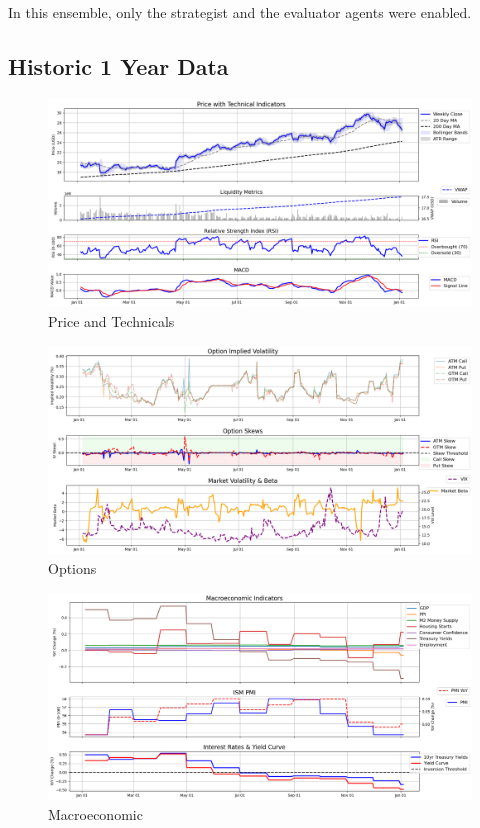 \documentclass[8pt]{scrartcl}
\begin{document}
In this ensemble, only the strategist and the evaluator agents were enabled.

\subsection*{Historic 1 Year Data}

\begin{figure}[H]
    \centering
    \includegraphics[width=1\linewidth]{judge_reviews/AAPL_M_gpt-4o-mini//2015-01-05/judge_Price_with_Technical_Indicators.png}
    \caption{Price and Technicals}
\end{figure}

\begin{figure}[H]
    \centering
    \includegraphics[width=1\linewidth]{judge_reviews/AAPL_M_gpt-4o-mini/2015-01-05/judge_Option_Implied_Volatility.png}
    \caption{Options}
\end{figure}

\begin{figure}[H]
    \centering
    \includegraphics[width=1\linewidth]{judge_reviews/AAPL_M_gpt-4o-mini/2015-01-05/judge_Macroeconomic_Indicators.png}
    \caption{Macroeconomic}
\end{figure}
\end{document}
